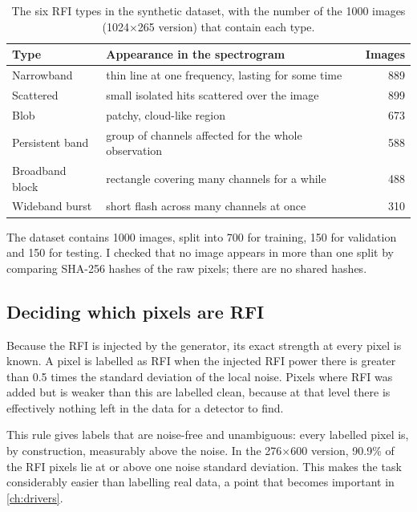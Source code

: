 \begin{table}[H]
  \centering
  \caption{The six RFI types in the synthetic dataset, with the number of the
    1000 images (1024$\times$265 version) that contain each type.}
  \label{tab:rfi_types}
  \begin{tabular}{llr}
    \toprule
    Type & Appearance in the spectrogram & Images \\
    \midrule
    Narrowband      & thin line at one frequency, lasting for some time  & 889 \\
    Scattered       & small isolated hits scattered over the image        & 899 \\
    Blob            & patchy, cloud-like region                           & 673 \\
    Persistent band & group of channels affected for the whole observation & 588 \\
    Broadband block & rectangle covering many channels for a while        & 488 \\
    Wideband burst  & short flash across many channels at once            & 310 \\
    \bottomrule
  \end{tabular}
\end{table}

The dataset contains 1000 images, split into 700 for training, 150 for
validation and 150 for testing. I checked that no image appears in more than
one split by comparing SHA-256 hashes of the raw pixels; there are no shared
hashes.

\subsection{Deciding which pixels are RFI}
\label{sec:synthetic_label}
Because the RFI is injected by the generator, its exact strength at every
pixel is known. A pixel is labelled as RFI when the injected RFI power there
is greater than 0.5 times the standard deviation of the local noise. Pixels
where RFI was added but is weaker than this are labelled clean, because at
that level there is effectively nothing left in the data for a detector to
find.

This rule gives labels that are noise-free and unambiguous: every labelled
pixel is, by construction, measurably above the noise. In the 276$\times$600
version, 90.9\% of the RFI pixels lie at or above one noise standard
deviation. This makes the task considerably easier than labelling real data,
a point that becomes important in \cref{ch:drivers}.

